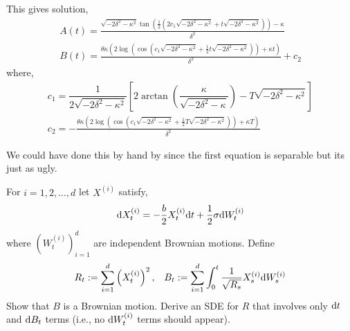 \begin{solution}[Solution]
This gives solution,
\begin{align*}
    A(t) = \frac{\sqrt{-2 \delta ^2-\kappa ^2} \tan \left(\frac{1}{2} \left(2 c_1 \sqrt{-2 \delta ^2-\kappa ^2}+t \sqrt{-2 \delta ^2-\kappa ^2}\right)\right)-\kappa }{\delta ^2} \\
    B(t) = \frac{\theta  \kappa  \left(2 \log \left(\cos \left(c_1 \sqrt{-2 \delta ^2-\kappa ^2}+\frac{1}{2} t \sqrt{-2 \delta ^2-\kappa ^2}\right)\right)+\kappa  t\right)}{\delta ^2}+c_2
\end{align*}
where,
\begin{align*}
    c_1 = \dfrac{1}{2\sqrt{-2\delta^2-\kappa^2}} \left[ 2\arctan\left(\dfrac{\kappa}{\sqrt{-2\delta^2-\kappa}} \right) - T\sqrt{-2\delta^2-\kappa^2} \right] \\
    c_2 =  -\frac{\theta  \kappa  \left(2 \log \left(\cos \left(c_1 \sqrt{-2 \delta ^2-\kappa ^2}+\frac{1}{2} T \sqrt{-2 \delta ^2-\kappa ^2}\right)\right)+\kappa  T\right)}{\delta ^2}
\end{align*}

We could have done this by hand by since the first equation is separable but its just as ugly.
\end{solution}

\begin{problem}[Exercise 9.2]
\end{problem}

\begin{solution}[Solution]
\end{solution}

\begin{problem}[Exercise 9.3]
For \( i=1,2, \ldots, d \) let \( X^{(i)} \) satisfy,
    \begin{align*}
        \mathrm{d} X_t^{(i)} = -\dfrac{b}{2} X_t^{(i)} \mathrm{d} t + \dfrac{1}{2}\sigma\mathrm{d} W_t^{(i)}
    \end{align*}
    where \( (W_t^{(i)})_{i=1}^{d} \) are independent Brownian motions. Define
    \begin{align*}
        R_t := \sum_{i=1}^{d} \left(X_t^{(i)}\right)^2, && B_t := \sum_{i=1}^{d} \int_{0}^{t} \dfrac{1}{\sqrt{R_s}}X_s^{(i)} \mathrm{d} W_s^{(i)}
    \end{align*}
    Show that \( B \) is a Brownian motion. Derive an SDE for \( R \) that involves only \( \mathrm{d} t \) and \( \mathrm{d} B_t \) terms (i.e., no \( \mathrm{d} W_t^{(i)} \) terms should appear).
\end{problem}

